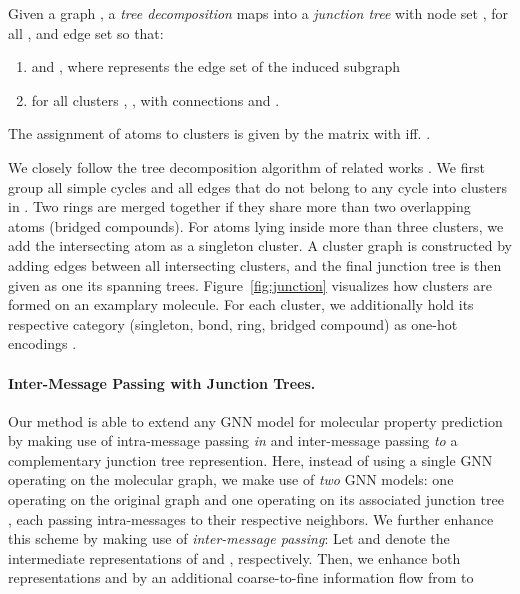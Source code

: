 \documentclass{article}
\begin{document}
Given a graph , a \emph{tree decomposition} maps  into a \emph{junction tree}  with node set ,  for all , and edge set  so that:

\vspace{-0.25cm}

\begin{enumerate}
  \item  and , where  represents the edge set of the induced subgraph 
  \item  for all clusters , ,  with connections  and .
\end{enumerate}

\vspace{-0.25cm}

The assignment of atoms  to clusters  is given by the matrix  with  iff. .

We closely follow the tree decomposition algorithm of related works \citep{Rarey/Dixon/1998,Jin/etal/2018}.
We first group all simple cycles and all edges that do not belong to any cycle into clusters in .
Two rings are merged together if they share more than two overlapping atoms (bridged compounds).
For atoms lying inside more than three clusters, we add the intersecting atom as a singleton cluster.
A cluster graph is constructed by adding edges between all intersecting clusters, and the final junction tree  is then given as one its spanning trees.
Figure~\ref{fig:junction} visualizes how clusters  are formed on an examplary molecule.
For each cluster, we additionally hold its respective category (singleton, bond, ring, bridged compound) as one-hot encodings .

\paragraph{Inter-Message Passing with Junction Trees.}\label{par:inter-message_passing_with_junction_trees}

Our method is able to extend any GNN model for molecular property prediction by making use of intra-message passing \emph{in} and inter-message passing \emph{to} a complementary junction tree represention.
Here, instead of using a single GNN operating on the molecular graph, we make use of \emph{two} GNN models: one operating on the original graph  and one operating on its associated junction tree , each passing intra-messages to their respective neighbors.
We further enhance this scheme by making use of \emph{inter-message passing}:
Let  and  denote the intermediate representations of  and , respectively.
Then, we enhance both representations  and  by an additional coarse-to-fine information flow from  to 
\end{document}
